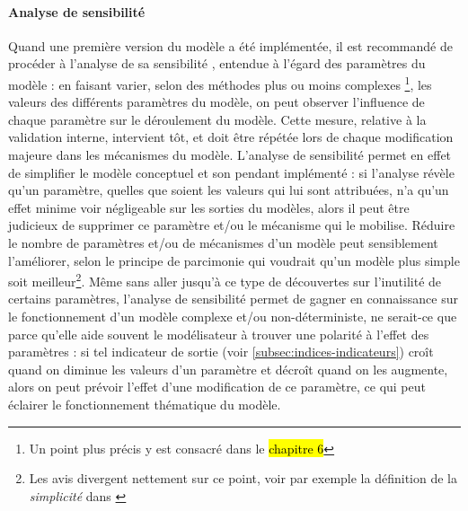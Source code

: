 \paragraph{Analyse de sensibilité}
Quand une première version du modèle a été implémentée, il est recommandé de procéder à l'analyse de sa \og sensibilité \fg{}, entendue à l'égard des paramètres du modèle : en faisant varier, selon des méthodes plus ou moins complexes
\footnote{
	Un point plus précis y est consacré dans le \hl{chapitre 6}
}, les valeurs des différents paramètres du modèle, on peut observer l'influence de chaque paramètre sur le déroulement du modèle.
Cette mesure, relative à la validation interne, intervient tôt, et doit être répétée lors de chaque modification majeure dans les mécanismes du modèle.
L'analyse de sensibilité permet en effet de simplifier le modèle conceptuel et son pendant implémenté :
	si l'analyse révèle qu'un paramètre, quelles que soient les valeurs qui lui sont attribuées, n'a qu'un effet minime voir négligeable sur les sorties du modèles, alors il peut être judicieux de supprimer ce paramètre et/ou le mécanisme qui le mobilise.
Réduire le nombre de paramètres et/ou de mécanismes d'un modèle peut sensiblement l'améliorer, selon le principe de parcimonie qui voudrait qu'un modèle plus simple soit meilleur\footnote{Les avis divergent nettement sur ce point, voir par exemple la définition de la \textit{simplicité} dans \cite[120]{amblard_evaluation_2006}}.
Même sans aller jusqu'à ce type de découvertes sur l'inutilité de certains paramètres, l'analyse de sensibilité permet de gagner en connaissance sur le fonctionnement d'un modèle complexe et/ou non-déterministe, ne serait-ce que parce qu'elle aide souvent le modélisateur à trouver une \og polarité \fg{} à l'effet des paramètres :
	si tel indicateur de sortie (voir \cref{subsec:indices-indicateurs}) croît quand on diminue les valeurs d'un paramètre et décroît quand on les augmente, alors on peut prévoir l'effet d'une modification de ce paramètre, ce qui peut éclairer le fonctionnement thématique du modèle.

